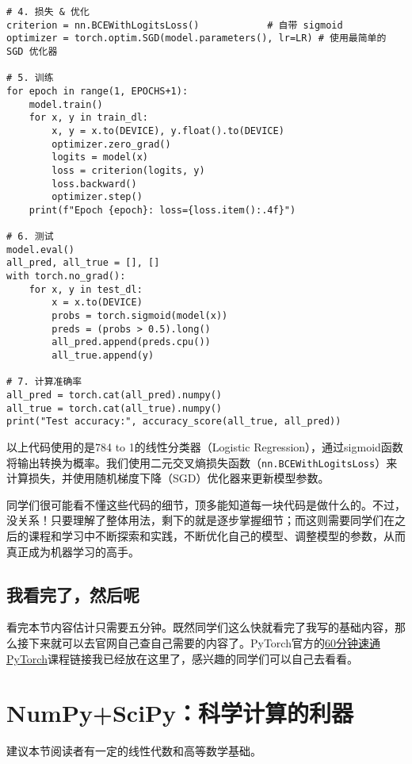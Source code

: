 \documentclass[../main.tex]{subfiles}
\begin{document}
\begin{lstlisting}
# 4. 损失 & 优化
criterion = nn.BCEWithLogitsLoss()            # 自带 sigmoid
optimizer = torch.optim.SGD(model.parameters(), lr=LR) # 使用最简单的 SGD 优化器

# 5. 训练
for epoch in range(1, EPOCHS+1):
    model.train()
    for x, y in train_dl:
        x, y = x.to(DEVICE), y.float().to(DEVICE)
        optimizer.zero_grad()
        logits = model(x)
        loss = criterion(logits, y)
        loss.backward()
        optimizer.step()
    print(f"Epoch {epoch}: loss={loss.item():.4f}")

# 6. 测试
model.eval()
all_pred, all_true = [], []
with torch.no_grad():
    for x, y in test_dl:
        x = x.to(DEVICE)
        probs = torch.sigmoid(model(x))
        preds = (probs > 0.5).long()
        all_pred.append(preds.cpu())
        all_true.append(y)

# 7. 计算准确率
all_pred = torch.cat(all_pred).numpy()
all_true = torch.cat(all_true).numpy()
print("Test accuracy:", accuracy_score(all_true, all_pred))
\end{lstlisting}

以上代码使用的是784 to 1的线性分类器（Logistic Regression），通过sigmoid函数将输出转换为概率。我们使用二元交叉熵损失函数（\texttt{nn.BCEWithLogitsLoss}）来计算损失，并使用随机梯度下降（SGD）优化器来更新模型参数。

同学们很可能看不懂这些代码的细节，顶多能知道每一块代码是做什么的。不过，没关系！只要理解了整体用法，剩下的就是逐步掌握细节；而这则需要同学们在之后的课程和学习中不断探索和实践，不断优化自己的模型、调整模型的参数，从而真正成为机器学习的高手。

\subsection{我看完了，然后呢}

看完本节内容估计只需要五分钟。既然同学们这么快就看完了我写的基础内容，那么接下来就可以去官网自己查自己需要的内容了。PyTorch官方的\href{https://docs.pytorch.org/tutorials/beginner/deep_learning_60min_blitz.html}{60分钟速通PyTorch}课程链接我已经放在这里了，感兴趣的同学们可以自己去看看。

\section{NumPy+SciPy：科学计算的利器}

\begin{flushright}
  { \kaishu 建议本节阅读者有一定的线性代数和高等数学基础。}
\end{flushright}
\end{document}
